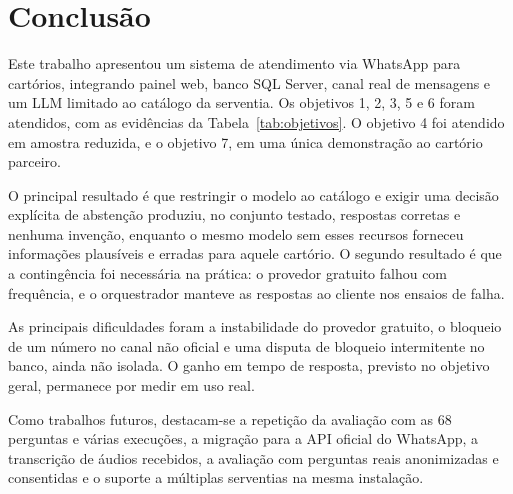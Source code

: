 \documentclass[conference]{IEEEtran}
\begin{document}
\section{Conclusão}\label{sec:conclusao}

Este trabalho apresentou um sistema de atendimento via WhatsApp para cartórios, integrando painel web, banco SQL Server, canal real de mensagens e um LLM limitado ao catálogo da serventia. Os objetivos 1, 2, 3, 5 e 6 foram atendidos, com as evidências da Tabela~\ref{tab:objetivos}. O objetivo 4 foi atendido em amostra reduzida, e o objetivo 7, em uma única demonstração ao cartório parceiro.

O principal resultado é que restringir o modelo ao catálogo e exigir uma decisão explícita de abstenção produziu, no conjunto testado, respostas corretas e nenhuma invenção, enquanto o mesmo modelo sem esses recursos forneceu informações plausíveis e erradas para aquele cartório. O segundo resultado é que a contingência foi necessária na prática: o provedor gratuito falhou com frequência, e o orquestrador manteve as respostas ao cliente nos ensaios de falha.

As principais dificuldades foram a instabilidade do provedor gratuito, o bloqueio de um número no canal não oficial e uma disputa de bloqueio intermitente no banco, ainda não isolada. O ganho em tempo de resposta, previsto no objetivo geral, permanece por medir em uso real.

Como trabalhos futuros, destacam-se a repetição da avaliação com as 68 perguntas e várias execuções, a migração para a API oficial do WhatsApp, a transcrição de áudios recebidos, a avaliação com perguntas reais anonimizadas e consentidas e o suporte a múltiplas serventias na mesma instalação.
\end{document}
